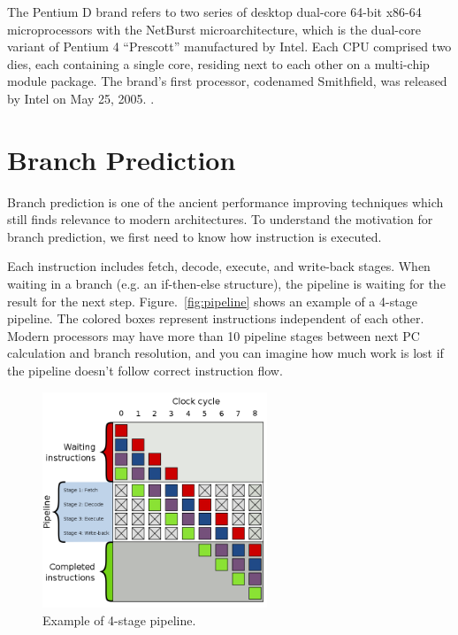 \documentclass[doc,natbib,12pt]{apa6}
\begin{document}
	The Pentium D brand refers to two series of desktop dual-core 64-bit x86-64 microprocessors with the NetBurst microarchitecture, which is the dual-core variant of Pentium 4 ``Prescott'' manufactured by Intel. Each CPU comprised two dies, each containing a single core, residing next to each other on a multi-chip module package. The brand's first processor, codenamed Smithfield, was released by Intel on May 25, 2005. \citep{Intel2007}.
	
	\newpage
	\section{Branch Prediction} \label{chp:branchPrediction}
	
	Branch prediction is one of the ancient performance improving techniques which still finds relevance to modern architectures. To understand the motivation for branch prediction, we first need to know how instruction is executed.
	
	Each instruction includes fetch, decode, execute, and write-back stages. When waiting in a branch (e.g. an if-then-else structure), the pipeline is waiting for the result for the next step. Figure.~\vref{fig:pipeline} shows an example of a 4-stage pipeline. The colored boxes represent instructions independent of each other. Modern processors may have more than 10 pipeline stages between next PC calculation and branch resolution, and you can imagine how much work is lost if the pipeline doesn't follow correct instruction flow.
	
	\begin{figure}[htpb]
		\centering
		\includegraphics[width=0.6\textwidth]{660px-Pipeline.png}
		\caption{\label{fig:pipeline}Example of 4-stage pipeline. \citep{Kolinko}}
	\end{figure}
	
\end{document}
